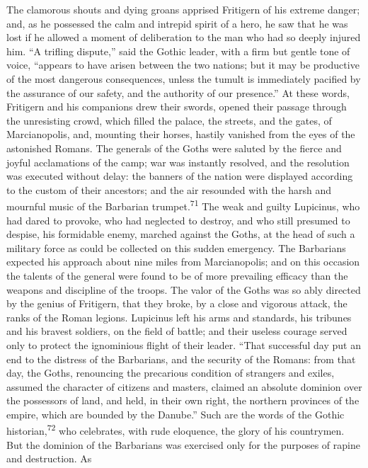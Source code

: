 The clamorous shouts and dying groans apprised Fritigern of his
extreme danger; and, as he possessed the calm and intrepid spirit
of a hero, he saw that he was lost if he allowed a moment of
deliberation to the man who had so deeply injured him. “A
trifling dispute,” said the Gothic leader, with a firm but gentle
tone of voice, “appears to have arisen between the two nations;
but it may be productive of the most dangerous consequences,
unless the tumult is immediately pacified by the assurance of our
safety, and the authority of our presence.” At these words,
Fritigern and his companions drew their swords, opened their
passage through the unresisting crowd, which filled the palace,
the streets, and the gates, of Marcianopolis, and, mounting their
horses, hastily vanished from the eyes of the astonished Romans.
The generals of the Goths were saluted by the fierce and joyful
acclamations of the camp; war was instantly resolved, and the
resolution was executed without delay: the banners of the nation
were displayed according to the custom of their ancestors; and
the air resounded with the harsh and mournful music of the
Barbarian trumpet.\textsuperscript{71} The weak and guilty Lupicinus, who had
dared to provoke, who had neglected to destroy, and who still
presumed to despise, his formidable enemy, marched against the
Goths, at the head of such a military force as could be collected
on this sudden emergency. The Barbarians expected his approach
about nine miles from Marcianopolis; and on this occasion the
talents of the general were found to be of more prevailing
efficacy than the weapons and discipline of the troops. The valor
of the Goths was so ably directed by the genius of Fritigern,
that they broke, by a close and vigorous attack, the ranks of the
Roman legions. Lupicinus left his arms and standards, his
tribunes and his bravest soldiers, on the field of battle; and
their useless courage served only to protect the ignominious
flight of their leader. “That successful day put an end to the
distress of the Barbarians, and the security of the Romans: from
that day, the Goths, renouncing the precarious condition of
strangers and exiles, assumed the character of citizens and
masters, claimed an absolute dominion over the possessors of
land, and held, in their own right, the northern provinces of the
empire, which are bounded by the Danube.” Such are the words of
the Gothic historian,\textsuperscript{72} who celebrates, with rude eloquence, the
glory of his countrymen. But the dominion of the Barbarians was
exercised only for the purposes of rapine and destruction. As
